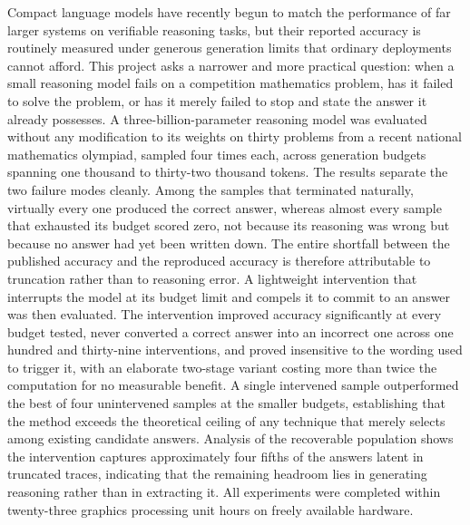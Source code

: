 \documentclass[12pt,a4paper,oneside]{report}
\begin{document}
Compact language models have recently begun to match the performance of far
larger systems on verifiable reasoning tasks, but their reported accuracy is
routinely measured under generous generation limits that ordinary deployments
cannot afford. This project asks a narrower and more practical question: when a
small reasoning model fails on a competition mathematics problem, has it failed
to solve the problem, or has it merely failed to stop and state the answer it
already possesses. A three-billion-parameter reasoning model was evaluated
without any modification to its weights on thirty problems from a recent
national mathematics olympiad, sampled four times each, across generation
budgets spanning one thousand to thirty-two thousand tokens. The results
separate the two failure modes cleanly. Among the samples that terminated
naturally, virtually every one produced the correct answer, whereas almost every
sample that exhausted its budget scored zero, not because its reasoning was
wrong but because no answer had yet been written down. The entire shortfall
between the published accuracy and the reproduced accuracy is therefore
attributable to truncation rather than to reasoning error. A lightweight
intervention that interrupts the model at its budget limit and compels it to
commit to an answer was then evaluated. The intervention improved accuracy
significantly at every budget tested, never converted a correct answer into an
incorrect one across one hundred and thirty-nine interventions, and proved
insensitive to the wording used to trigger it, with an elaborate two-stage
variant costing more than twice the computation for no measurable benefit. A
single intervened sample outperformed the best of four unintervened samples at
the smaller budgets, establishing that the method exceeds the theoretical
ceiling of any technique that merely selects among existing candidate answers.
Analysis of the recoverable population shows the intervention captures
approximately four fifths of the answers latent in truncated traces, indicating
that the remaining headroom lies in generating reasoning rather than in
extracting it. All experiments were completed within twenty-three graphics
processing unit hours on freely available hardware.

\tableofcontents
\listoffigures
\listoftables
\clearpage

\end{document}
